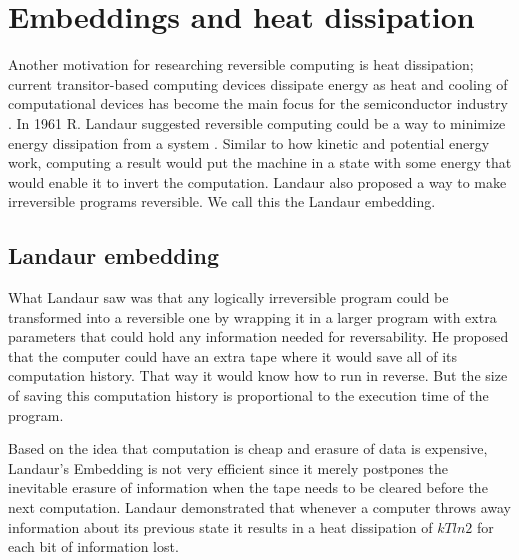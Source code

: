 

\section{Embeddings and heat dissipation}
Another motivation for researching reversible computing is heat dissipation; current transitor-based computing devices dissipate energy as heat and cooling of computational devices has become the main focus for the semiconductor industry \cite{semiconductors_valley}. In 1961 R. Landaur suggested reversible computing could be a way to minimize energy dissipation from a system \cite{Irreversibility_paper}.
Similar to how kinetic and potential energy work, computing a result would put the machine in a state with some energy that would enable it to invert the computation.
Landaur also proposed a way to make irreversible programs reversible. We call this the Landaur embedding.


\subsection{Landaur embedding}
What Landaur saw was that any logically irreversible program could be transformed into a reversible one by wrapping it in a larger program with extra parameters that could hold any information needed for reversability. He proposed that the computer could have an extra tape where it would save all of its computation history. That way it would know how to run in reverse. But the size of saving this computation history is proportional to the execution time of the program.

Based on the idea that computation is cheap and erasure of data is expensive, Landaur's Embedding is not very efficient since it merely postpones the inevitable erasure of information when the tape needs to be cleared before the next computation.
Landaur demonstrated that whenever a computer throws away information about its previous state it results in a heat dissipation of $kT ln 2$ for each bit of information lost.
